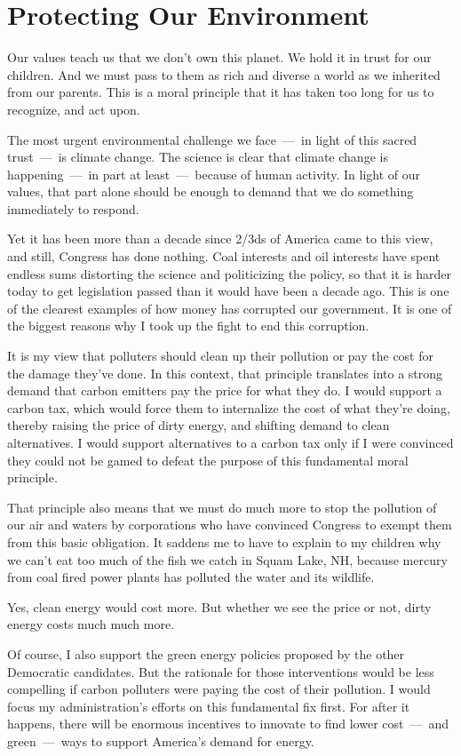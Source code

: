 \section{Protecting Our Environment}

Our values teach us that we don't own this planet. We hold it in trust for our children. And we must pass to them as rich and diverse a world as we inherited from our parents. This is a moral principle that it has taken too long for us to recognize, and act upon.

The most urgent environmental challenge we face~---~in light of this sacred trust~---~is climate change. The science is clear that climate change is happening~---~in part at least~---~because of human activity. In light of our values, that part alone should be enough to demand that we do something immediately to respond.

Yet it has been more than a decade since 2/3ds of America came to this view, and still, Congress has done nothing. Coal interests and oil interests have spent endless sums distorting the science and politicizing the policy, so that it is harder today to get legislation passed than it would have been a decade ago. This is one of the clearest examples of how money has corrupted our government. It is one of the biggest reasons why I took up the fight to end this corruption.

It is my view that polluters should clean up their pollution or pay the cost for the damage they've done. In this context, that principle translates into a strong demand that carbon emitters pay the price for what they do. I would support a carbon tax, which would force them to internalize the cost of what they're doing, thereby raising the price of dirty energy, and shifting demand to clean alternatives. I would support alternatives to a carbon tax only if I were convinced they could not be gamed to defeat the purpose of this fundamental moral principle.

That principle also means that we must do much more to stop the pollution of our air and waters by corporations who have convinced Congress to exempt them from this basic obligation. It saddens me to have to explain to my children why we can't eat too much of the fish we catch in Squam Lake, NH, because mercury from coal fired power plants has polluted the water and its wildlife.

Yes, clean energy would cost more. But whether we see the price or not, dirty energy costs much much more.

Of course, I also support the green energy policies proposed by the other Democratic candidates. But the rationale for those interventions would be less compelling if carbon polluters were paying the cost of their pollution. I would focus my administration's efforts on this fundamental fix first. For after it happens, there will be enormous incentives to innovate to find lower cost~---~and green~---~ways to support America's demand for energy.

